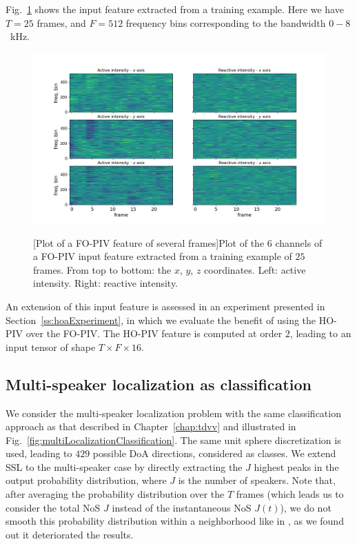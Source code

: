 Fig.~\ref{fig:foaIntensityVector} shows the input feature extracted from a training example. Here we have $T = 25$ frames, and $F=512$ frequency bins corresponding to the bandwidth $0-8$~kHz.

\begin{figure}[ht]
    \begin{adjustbox}{width=1.3\textwidth,center}
        \includegraphics[width=1.\linewidth]{Images/chap7/foaIntensityVector.png}
    \end{adjustbox}
    [Plot of a FO-PIV feature of several frames]{Plot of the 6 channels of a FO-PIV input feature extracted from a training example of $25$ frames. From top to bottom: the $x$, $y$, $z$ coordinates. Left: active intensity. Right: reactive intensity.}
    \label{fig:foaIntensityVector}
\end{figure}

An extension of this input feature is assessed in an experiment presented in Section~\ref{ss:hoaExperiment}, in which we evaluate the benefit of using the HO-PIV over the FO-PIV. The HO-PIV feature is computed at order $2$, leading to an input tensor of shape $T \times F \times 16$.

\subsection{Multi-speaker localization as classification}
\label{ss:multiLocaClassif}

We consider the multi-speaker localization problem with the same classification approach as that described in Chapter~\ref{chap:tdvv} and illustrated in Fig.~\ref{fig:multiLocalizationClassification}. The same unit sphere discretization is used, leading to $429$ possible DoA directions, considered as classes. We extend SSL to the multi-speaker case by directly extracting the $J$ highest peaks in the output probability distribution, where $J$ is the number of speakers.
Note that, after averaging the probability distribution over the $T$ frames (which leads us to consider the total NoS $J$ instead of the instantaneous NoS $J(t)$), we do not smooth this probability distribution within a neighborhood like in \cite{perotin_crnn-based_2019}, as we found out it deteriorated the results.


